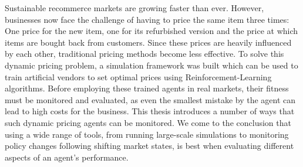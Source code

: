 Sustainable recommerce markets are growing faster than ever. However, businesses now face the challenge of having to price the same item three times: One price for the new item, one for its refurbished version and the price at which items are bought back from customers. Since these prices are heavily influenced by each other, traditional pricing methods become less effective. To solve this dynamic pricing problem, a simulation framework was built which can be used to train artificial vendors to set optimal prices using Reinforcement-Learning algorithms.
Before employing these trained agents in real markets, their fitness must be monitored and evaluated, as even the smallest mistake by the agent can lead to high costs for the business. This thesis introduces a number of ways that such dynamic pricing agents can be monitored. We come to the conclusion that using a wide range of tools, from running large-scale simulations to monitoring policy changes following shifting market states, is best when evaluating different aspects of an agent's performance.